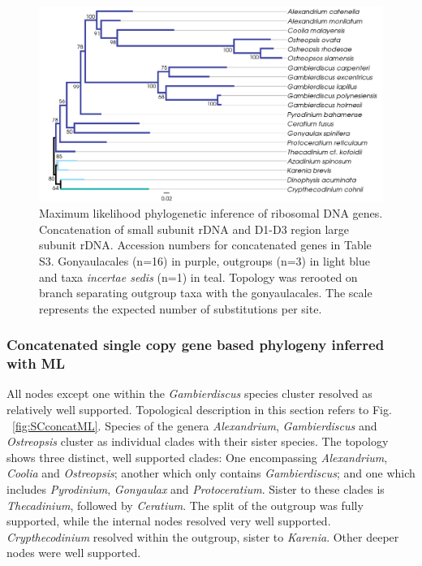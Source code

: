 \documentclass[fleqn,10pt,lineno]{wlpeerj} %
\begin{document}
\begin{figure}[ht]
\centering
\includegraphics[width=\linewidth]{gonya-figs/rDNA-ML.png} 
\caption{Maximum likelihood phylogenetic inference of ribosomal DNA genes. Concatenation of small subunit rDNA and D1-D3 region large subunit rDNA. Accession numbers for concatenated genes in Table S3. Gonyaulacales (n=16) in purple, outgroups (n=3) in light blue and taxa \textit{incertae sedis} (n=1) in teal. Topology was rerooted on branch separating outgroup taxa with the gonyaulacales. The scale represents the expected number of substitutions per site.} 
\label{fig:rdna}
\end{figure} 

\subsubsection*{Concatenated single copy gene based phylogeny inferred with ML}
All nodes except one within the \emph{Gambierdiscus} species cluster resolved as relatively well supported. 
Topological description in this section refers to Fig. ~\ref{fig:SCconcatML}. 
Species of the genera \emph{Alexandrium}, \emph{Gambierdiscus} and \emph{Ostreopsis} cluster as individual clades with their sister species.  
The topology shows three distinct, well supported clades: 
One encompassing \emph{Alexandrium}, \emph{Coolia} and \emph{Ostreopsis}; another which only contains \emph{Gambierdiscus}; and one which includes \emph{Pyrodinium}, \emph{Gonyaulax} and \emph{Protoceratium}. 
Sister to these clades is \emph{Thecadinium}, followed by \emph{Ceratium}.
The split of the outgroup was fully supported, while the internal nodes resolved very well supported. 
\emph{Crypthecodinium} resolved within the outgroup, sister to \emph{Karenia}. 
Other deeper nodes were well supported.
 
\end{document}
